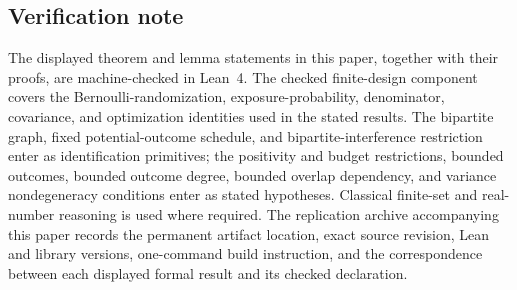 \subsection{Verification note}

The displayed theorem and lemma statements in this paper, together with their proofs, are machine-checked in Lean~4. The checked finite-design component covers the Bernoulli-randomization, exposure-probability, denominator, covariance, and optimization identities used in the stated results. The bipartite graph, fixed potential-outcome schedule, and bipartite-interference restriction enter as identification primitives; the positivity and budget restrictions, bounded outcomes, bounded outcome degree, bounded overlap dependency, and variance nondegeneracy conditions enter as stated hypotheses. Classical finite-set and real-number reasoning is used where required. The replication archive accompanying this paper records the permanent artifact location, exact source revision, Lean and library versions, one-command build instruction, and the correspondence between each displayed formal result and its checked declaration.
